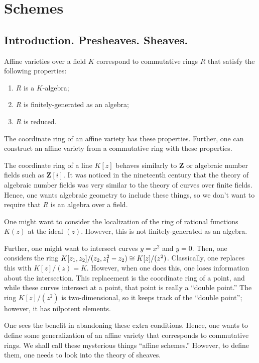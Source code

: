 \documentclass [11 pt, oneside] {article}
\begin{document}
\section{Schemes}

\subsection{Introduction. Presheaves. Sheaves.}
Affine varieties over a field $K$ correspond to commutative rings $R$ that satisfy the following properties:
\begin{enumerate}
	\item $R$ is a $K$-algebra;
	\item $R$ is finitely-generated as an algebra;
	\item $R$ is reduced.
\end{enumerate}
The coordinate ring of an affine variety has these properties. Further, one can construct an affine variety from a commutative ring with these properties.

The coordinate ring of a line $K[z]$ behaves similarly to $\mathbf{Z}$ or algebraic number fields such as $\mathbf{Z}[i]$. It was noticed in the nineteenth century that the theory of algebraic number fields was very similar to the theory of curves over finite fields. Hence, one wants algebraic geometry to include these things, so we don't want to require that $R$ is an algebra over a field. 

One might want to consider the localization of the ring of rational functions $K(z)$ at the ideal $(z)$. However, this is not finitely-generated as an algebra.

Further, one might want to intersect curves $y=x^2$ and $y=0$. Then, one considers the ring $K[z_1,z_2]/(z_2,z_1^2-z_2) \cong K[z]/ (z^2)$. Classically, one replaces this with $K[z]/(z) = K$. However, when one does this, one loses information about the intersection. This replacement is the coordinate ring of a point, and while these curves intersect at a point, that point is really a ``double point.'' The ring $K[z]/(z^2)$ is two-dimensional, so it keeps track of the ``double point''; however, it has nilpotent elements.

One sees the benefit in abandoning these extra conditions. Hence, one wants to define some generalization of an affine variety that corresponds to commutative rings. We shall call these mysterious things ``affine schemes.'' However, to define them, one needs to look into the theory of sheaves.
\end{document}
